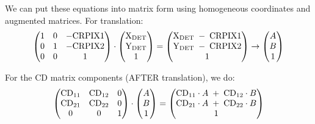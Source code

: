 \documentclass{article}
\begin{document}
We can put these equations into matrix form using homogeneous 
coordinates and augmented matrices. For translation:
\[
   \begin{pmatrix}
      1 & 0 & -\mathrm{CRPIX1} \\
      0 & 1 & -\mathrm{CRPIX2} \\
      0 & 0 & 1
   \end{pmatrix}
   \cdot
   \begin{pmatrix}
      \mathrm{X}_{\mathrm{DET}} \\
      \mathrm{Y}_{\mathrm{DET}} \\
      1
   \end{pmatrix}
   =
   \begin{pmatrix}
      \mathrm{X}_{\mathrm{DET}} \;-\; \mathrm{CRPIX1} \\
      \mathrm{Y}_{\mathrm{DET}} \;-\; \mathrm{CRPIX2} \\
      1
   \end{pmatrix}
   \rightarrow
   \begin{pmatrix}
      A \\
      B \\
      1
   \end{pmatrix}
\]

For the CD matrix components (AFTER translation), we do:
\[
   \begin{pmatrix}
      \mathrm{CD}_{11} & \mathrm{CD}_{12} & 0 \\
      \mathrm{CD}_{21} & \mathrm{CD}_{22} & 0 \\
         0     &    0     & 1
   \end{pmatrix}
   \cdot
   \begin{pmatrix}
      A \\
      B \\
      1
   \end{pmatrix}
   =
   \begin{pmatrix}
      \mathrm{CD}_{11} \cdot A \; + \; \mathrm{CD}_{12} \cdot B \\
      \mathrm{CD}_{21} \cdot A \; + \; \mathrm{CD}_{22} \cdot B \\
      1
   \end{pmatrix}
\]
\end{document}
